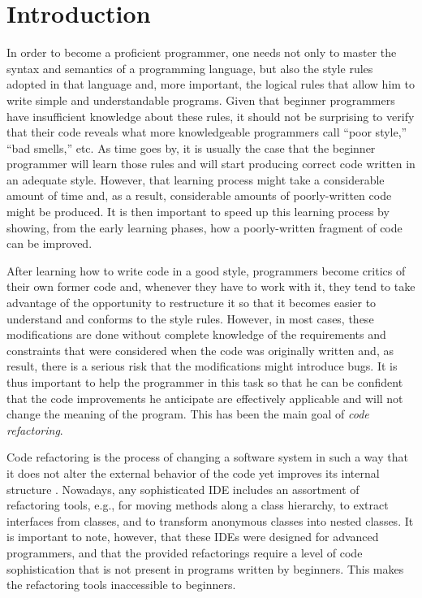 \section{Introduction}
In order to become a proficient programmer, one needs not only to
master the syntax and semantics of a programming language, but also
the style rules adopted in that language and, more important, the
logical rules that allow him to write simple and understandable
programs.  Given that beginner programmers have insufficient knowledge
about these rules, it should not be surprising to verify that their
code reveals what more knowledgeable programmers call ``poor style,''
``bad smells,'' etc.  As time goes by, it is usually the case that the
beginner programmer will learn those rules and will start producing
correct code written in an adequate style.  However, that learning
process might take a considerable amount of time and, as a result,
considerable amounts of poorly-written code might be produced.  It is
then important to speed up this learning process by showing, from the
early learning phases, how a poorly-written fragment of code can be
improved.

After learning how to write code in a good style, programmers become
critics of their own former code and, whenever they have to work with
it, they tend to take advantage of the opportunity to restructure it
so that it becomes easier to understand and conforms to the style
rules.  However, in most cases, these modifications are done without
complete knowledge of the requirements and constraints that were
considered when the code was originally written and, as result, there
is a serious risk that the modifications might introduce bugs.  It is
thus important to help the programmer in this task so that he can be
confident that the code improvements he anticipate are effectively
applicable and will not change the meaning of the program.  This has
been the main goal of \emph{code refactoring}.

Code refactoring is the process of changing a software system in such
a way that it does not alter the external behavior of the code yet
improves its internal structure \cite{fowler1999refactoring}.
Nowadays, any sophisticated IDE includes an assortment of refactoring
tools, e.g., for moving methods along a class hierarchy, to extract
interfaces from classes, and to transform anonymous classes into
nested classes.  It is important to note, however, that these IDEs
were designed for advanced programmers, and that the provided
refactorings require a level of code sophistication that is not
present in programs written by beginners.  This makes the refactoring
tools inaccessible to beginners.

